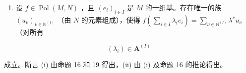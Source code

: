 \begin{enumerate}
\def\labelenumi{(\roman{enumi})}
\setcounter{enumi}{1}
\tightlist
\item
  设 \(f \in \operatorname{Pol}(M, N)\) ，且 \((e_i)_{i \in I}\) 是 \(M\) 的一组基。存在唯一的族 \((u_\nu)_{\nu \in \mathbb{N}^{(I)}}\) （由 \(N\) 的元素组成），使得 \(f\left(\sum_{i \in I} \lambda_i e_i\right) = \sum_{\nu \in \mathbb{N}^{(I)}} \lambda^\nu u_\nu\) （对所有
\end{enumerate}

\[
\left(\lambda_ {i}\right) \in \mathbf {A} ^ {(I)}
\]

成立。断言 (i) 由命题 16 和 19 得出，(ii) 由 (i) 及命题 16 的推论得出。
\relax{}
